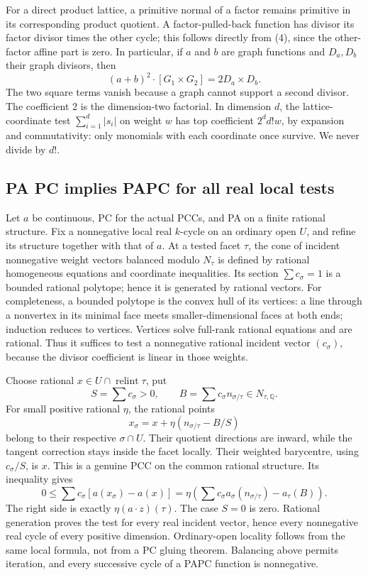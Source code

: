 \documentclass[
  10pt,
]{article}
\begin{document}
For a direct product lattice, a primitive normal of a factor remains
primitive in its corresponding product quotient. A factor-pulled-back
function has divisor its factor divisor times the other cycle; this
follows directly from (4), since the other-factor affine part is zero.
In particular, if \(a\) and \(b\) are graph functions and \(D_a,D_b\)
their graph divisors, then \[
 (a+b)^2\cdot[G_1\times G_2]=2D_a\times D_b.                  \tag{7}
\] The two square terms vanish because a graph cannot support a second
divisor. The coefficient 2 is the dimension-two factorial. In dimension
\(d\), the lattice-coordinate test \(\sum_{i=1}^d|s_i|\) on weight \(w\)
has top coefficient \(2^d d!w\), by expansion and commutativity: only
monomials with each coordinate once survive. We never divide by \(d!\).

\subsection{PA PC implies PAPC for all real local
tests}\label{pa-pc-implies-papc-for-all-real-local-tests}

Let \(a\) be continuous, PC for the actual PCCs, and PA on a finite
rational structure. Fix a nonnegative local real \(k\)-cycle on an
ordinary open \(U\), and refine its structure together with that of
\(a\). At a tested facet \(\tau\), the cone of incident nonnegative
weight vectors balanced modulo \(N_\tau\) is defined by rational
homogeneous equations and coordinate inequalities. Its section
\(\sum c_\sigma=1\) is a bounded rational polytope; hence it is
generated by rational vectors. For completeness, a bounded polytope is
the convex hull of its vertices: a line through a nonvertex in its
minimal face meets smaller-dimensional faces at both ends; induction
reduces to vertices. Vertices solve full-rank rational equations and are
rational. Thus it suffices to test a nonnegative rational incident
vector \((c_\sigma)\), because the divisor coefficient is linear in
those weights.

Choose rational \(x\in U\cap\operatorname{relint}\tau\), put \[
 S=\sum c_\sigma>0,\qquad B=\sum c_\sigma n_{\sigma/\tau}\in N_{\tau,\mathbb{Q}}.
\] For small positive rational \(\eta\), the rational points \[
 x_\sigma=x+\eta(n_{\sigma/\tau}-B/S)
\] belong to their respective \(\sigma\cap U\). Their quotient
directions are inward, while the tangent correction stays inside the
facet locally. Their weighted barycentre, using \(c_\sigma/S\), is
\(x\). This is a genuine PCC on the common rational structure. Its
inequality gives \[
 0\leq\sum c_\sigma[a(x_\sigma)-a(x)]
 =\eta\left(\sum c_\sigma a_\sigma(n_{\sigma/\tau})-a_\tau(B)\right).
\] The right side is exactly \(\eta(a\cdot z)(\tau)\). The case \(S=0\)
is zero. Rational generation proves the test for every real incident
vector, hence every nonnegative real cycle of every positive dimension.
Ordinary-open locality follows from the same local formula, not from a
PC gluing theorem. Balancing above permits iteration, and every
successive cycle of a PAPC function is nonnegative.
\end{document}
